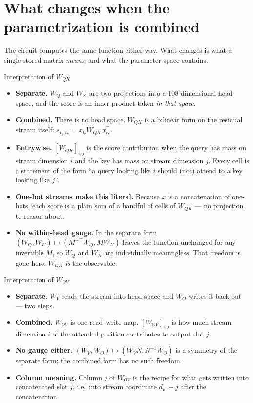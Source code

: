 \documentclass[11pt]{article}
\newcommand{\Wqk}{W_{QK}}
\newcommand{\Wov}{W_{OV}}
\newcommand{\Wq}{W_Q}
\newcommand{\Wk}{W_K}
\newcommand{\Wv}{W_V}
\newcommand{\Wo}{W_O}
\begin{document}
\tableofcontents
\newpage

\section{What changes when the parametrization is combined}

The circuit computes the same function either way. What changes is what a single stored matrix
\emph{means}, and what the parameter space contains.

\begin{interpbox}{Interpretation of $\Wqk$}
\begin{itemize}\itemsep2pt
\item \textbf{Separate.} $\Wq$ and $\Wk$ are two projections into a $108$-dimensional head space,
and the score is an inner product taken \emph{in that space}.
\item \textbf{Combined.} There is no head space. $\Wqk$ is a bilinear form on the residual stream
itself: $s_{t_q,t_k}=x_{t_q}\Wqk\,x_{t_k}^\top$.
\item \textbf{Entrywise.} $[\Wqk]_{i,j}$ is the score contribution when the query has mass on
stream dimension $i$ and the key has mass on stream dimension $j$. Every cell is a statement of
the form ``a query looking like $i$ should (not) attend to a key looking like $j$''.
\item \textbf{One-hot streams make this literal.} Because $x$ is a concatenation of one-hots,
each score is a plain sum of a handful of cells of $\Wqk$ --- no projection to reason about.
\item \textbf{No within-head gauge.} In the separate form $(\Wq,\Wk)\mapsto(M^{-\top}\Wq,M\Wk)$
leaves the function unchanged for any invertible $M$, so $\Wq$ and $\Wk$ are individually
meaningless. That freedom is gone here: $\Wqk$ \emph{is} the observable.
\end{itemize}
\end{interpbox}

\begin{interpbox}{Interpretation of $\Wov$}
\begin{itemize}\itemsep2pt
\item \textbf{Separate.} $\Wv$ reads the stream into head space and $\Wo$ writes it back out ---
two steps.
\item \textbf{Combined.} $\Wov$ is one read--write map. $[\Wov]_{i,j}$ is how much stream
dimension $i$ of the attended position contributes to output slot $j$.
\item \textbf{No gauge either.} $(\Wv,\Wo)\mapsto(\Wv N,N^{-1}\Wo)$ is a symmetry of the separate
form; the combined form has no such freedom.
\item \textbf{Column meaning.} Column $j$ of $\Wov$ is the recipe for what gets written into
concatenated slot $j$, i.e.\ into stream coordinate $d_{\mathrm{in}}+j$ after the concatenation.
\end{itemize}
\end{interpbox}
\end{document}
